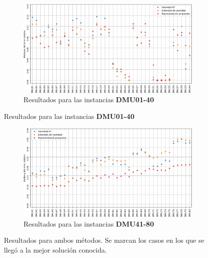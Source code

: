 \begin{figure}[H]
    \begin{subfigure}{\textwidth}
        \centering
        \includegraphics[scale=.6]{Imagenes/prvsn7vsn8err1.png}
        \caption{Resultados para las instancias \textbf{DMU01-40}}
    \end{subfigure}
\end{figure}
\begin{figure}[H]\ContinuedFloat
    \begin{subfigure}{\textwidth}
        \centering
        \includegraphics[scale=.6]{Imagenes/prvsn7vsn8err2.png}
        \caption{Resultados para las instancias \textbf{DMU41-80}}
    \end{subfigure}
    \caption{Resultados para ambos métodos. Se marcan los casos en los que se llegó a la mejor solución conocida.}
\end{figure}



